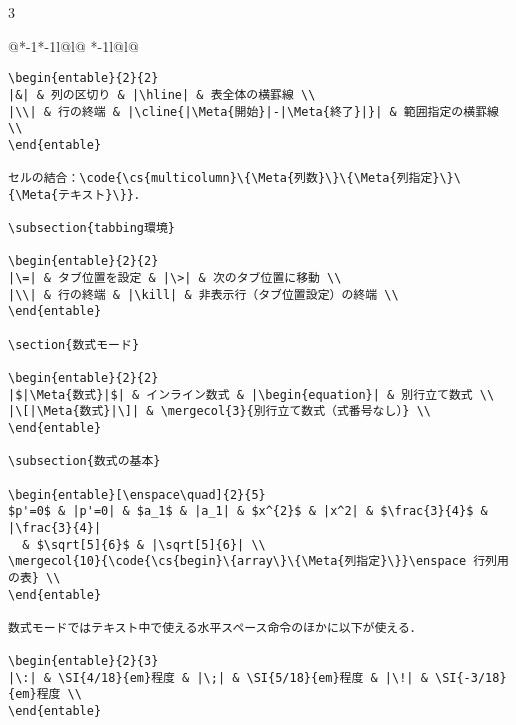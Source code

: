 \documentclass[10pt,a4paper,landscape,dvipdfmx]{jarticle}
\makeatletter
\def\set@etsep#1#2{\def\etcolsep{#1}\def\etitemsep{#2}}
\newenvironment{entable}[3][\quad\qquad]{%
  \set@etsep#1\relax\relax
  \begin{tabular}{%
    @{}*{\the\numexpr#3-1}{*{\the\numexpr#2-1}{l@{\etcolsep}}l@{\etitemsep}}%
    *{\the\numexpr#2-1}{l@{\etcolsep}}l@{}}}{%
  \end{tabular}}
\newcommand{\mergecol}[2]{\multicolumn{#1}{@{}l@{}}{#2}}
\newcommand*\eghostguarded{%
  \ifmmode \expandafter\@firstofone
  \else \expandafter\pxqgg@eghostguarded@a
  \fi}
\def\pxqgg@eghostguarded@a#1{%
  {\pxqgg@TI\pxqgg@cwm}%
  #1%
  {\pxqgg@TI\pxqgg@cwm}}
\newcommand{\codefont}{\ttfamily\gtfamily}
\newcommand{\cs}[1]{\eghostguarded{{\codefont \bs #1}}}
\newcommand{\code}[1]{\eghostguarded{{\codefont #1}}}
\newcommand{\Meta}[1]{$\langle$\mbox{}\emph{#1}\mbox{}$\rangle$}
\makeatother
\begin{document}
\begin{multicols}{3}
\begin{entable}[\enspace]{2}{1}
\begin{verbatim}
\begin{entable}{2}{2}
|&| & 列の区切り & |\hline| & 表全体の横罫線 \\
|\\| & 行の終端 & |\cline{|\Meta{開始}|-|\Meta{終了}|}| & 範囲指定の横罫線 \\
\end{entable}

セルの結合：\code{\cs{multicolumn}\{\Meta{列数}\}\{\Meta{列指定}\}\{\Meta{テキスト}\}}．

\subsection{tabbing環境}

\begin{entable}{2}{2}
|\=| & タブ位置を設定 & |\>| & 次のタブ位置に移動 \\
|\\| & 行の終端 & |\kill| & 非表示行（タブ位置設定）の終端 \\
\end{entable}

\section{数式モード}

\begin{entable}{2}{2}
|$|\Meta{数式}|$| & インライン数式 & |\begin{equation}| & 別行立て数式 \\
|\[|\Meta{数式}|\]| & \mergecol{3}{別行立て数式（式番号なし）} \\
\end{entable}

\subsection{数式の基本}

\begin{entable}[\enspace\quad]{2}{5}
$p'=0$ & |p'=0| & $a_1$ & |a_1| & $x^{2}$ & |x^2| & $\frac{3}{4}$ & |\frac{3}{4}|
  & $\sqrt[5]{6}$ & |\sqrt[5]{6}| \\
\mergecol{10}{\code{\cs{begin}\{array\}\{\Meta{列指定}\}}\enspace 行列用の表} \\
\end{entable}

数式モードではテキスト中で使える水平スペース命令のほかに以下が使える．

\begin{entable}{2}{3}
|\:| & \SI{4/18}{em}程度 & |\;| & \SI{5/18}{em}程度 & |\!| & \SI{-3/18}{em}程度 \\
\end{entable}


\end{verbatim}
\end{entable}
\end{multicols}
\end{document}
